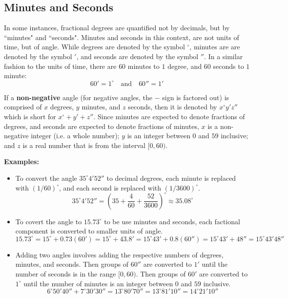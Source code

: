 \documentclass{article}
\begin{document}
\subsection{Minutes and Seconds}

In some instances, fractional degrees are quantified not by decimals, but by ``minutes" and ``seconds". Minutes and seconds in this context, are not units of time, but of angle. While degrees are denoted by the symbol \(^\circ\), minutes are are denoted by the symbol \('\), and seconds are denoted by the symbol \(''\). In a similar fashion to the units of time, there are \(60\) minutes to \(1\) degree, and \(60\) seconds to \(1\) minute:
\[60' = 1^\circ \quad \text{and} \quad 60'' = 1'\]

If a {\bf non-negative} angle (for negative angles, the \(-\) sign is factored out) is comprised of \(x\) degrees, \(y\) minutes, and \(z\) seconds, then it is denoted by \(x^\circ y' z''\) which is short for \(x^\circ + y' + z''\). Since minutes are expected to denote fractions of degrees, and seconds are expected to denote fractions of minutes, \(x\) is a non-negative integer (i.e. a whole number); \(y\) is an integer between \(0\) and \(59\) inclusive; and \(z\) is a real number that is from the interval \([0, 60)\). 

\textbf{Examples:}
\begin{itemize}
\item To convert the angle \(35^\circ4'52''\) to decimal degrees, each minute is replaced with \((1/60)^\circ\), and each second is replaced with \((1/3600)^\circ\).
\[35^\circ4'52'' = (35 + \frac{4}{60} + \frac{52}{3600})^\circ\approx 35.08^\circ\]
\item To covert the angle to \(15.73^\circ\) to be use minutes and seconds, each factional component is converted to smaller units of angle.
\[15.73^\circ = 15^\circ + 0.73(60') = 15^\circ + 43.8' = 15^\circ43' + 0.8(60'') = 15^\circ43' + 48'' = 15^\circ43'48''\]
\item Adding two angles involves adding the respective numbers of degrees, minutes, and seconds. Then groups of \(60''\) are converted to \(1'\) until the number of seconds is in the range \([0,60)\). Then groups of \(60'\) are converted to \(1^\circ\) until the number of minutes is an integer between \(0\) and \(59\) inclusive. 
\[6^\circ50'40'' + 7^\circ30'30'' = 13^\circ80'70'' = 13^\circ81'10'' = 14^\circ21'10''\]
\end{itemize}
\end{document}
